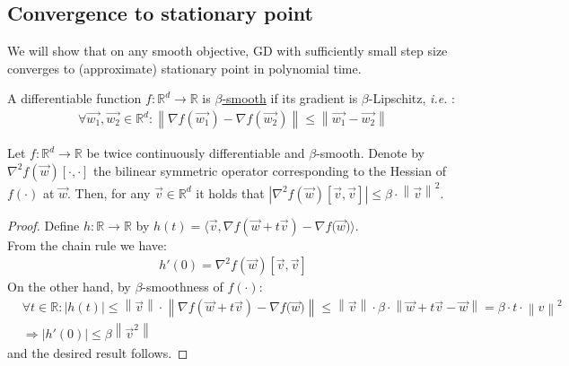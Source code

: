 \documentclass[12pt]{article}
\newcommand{\norm}[1]{\left\| #1 \right\|}
\newcommand{\ie}{{\it i.e. }}
\begin{document}
    \subsection{Convergence to stationary point}
    We will show that on any smooth objective, GD with sufficiently small step size converges to (approximate) stationary point in polynomial time.
	\begin{definition}
	\label{def:beta smooth function}				
		A differentiable function $f:\mathbb{R}^d\to\mathbb{R}$ is \underline{$\beta$-smooth} if its gradient is $\beta$-Lipschitz, \ie:
		\begin{align*}
		    \forall\overrightarrow{w_1},\overrightarrow{w_2}\in\mathbb{R}^d:\norm{\nabla{f(\overrightarrow{w_1})}-\nabla{f(\overrightarrow{w_2})}}\leq\norm{\overrightarrow{w_1}-\overrightarrow{w_2}}
	    \end{align*}
	\end{definition}
	\begin{lemma}
	\label{lem:twice continuously differentiable beta-smooth functions property 1}
		Let $f:\mathbb{R}^d\to\mathbb{R}$ be twice continuously differentiable and $\beta$-smooth. Denote by $\nabla^2f(\overrightarrow{w})[\cdot,\cdot]$ the bilinear symmetric operator corresponding to the Hessian of $f(\cdot)$ at $\overrightarrow{w}$. Then, for any $\overrightarrow{v}\in\mathbb{R}^d$ it holds that $|\nabla^2f(\overrightarrow{w})[\overrightarrow{v},\overrightarrow{v}]|\leq\beta\cdot\norm{\overrightarrow{v}}^2$.
	\end{lemma}
	\begin{proof}
	    Define $h:\mathbb{R}\to\mathbb{R}$ by $h(t)=\langle\overrightarrow{v},\nabla{f(\overrightarrow{w}+t\overrightarrow{v})}-\nabla{f(\overrightarrow{w}})\rangle$.
	    \\From the chain rule we have:
		\begin{align*}
		    h'(0) = \nabla^2f(\overrightarrow{w})[\overrightarrow{v},\overrightarrow{v}]
	    \end{align*}
	    On the other hand, by $\beta$-smoothness of $f(\cdot)$:
		\begin{align*}
		    & \forall t\in\mathbb{R}: |h(t)| \leq \norm{\overrightarrow{v}}\cdot\norm{\nabla{f(\overrightarrow{w}+t\overrightarrow{v})}-\nabla{f(\overrightarrow{w}})} \leq \norm{\overrightarrow{v}} \cdot \beta \cdot \norm{\overrightarrow{w}+t\overrightarrow{v} - \overrightarrow{w}} = \beta \cdot t \cdot \norm{v}^2\\
		    & \Longrightarrow |h'(0)| \leq \beta \norm{\overrightarrow{v}^2}
	    \end{align*}
	    and the desired result follows.
	\end{proof}
\end{document}
